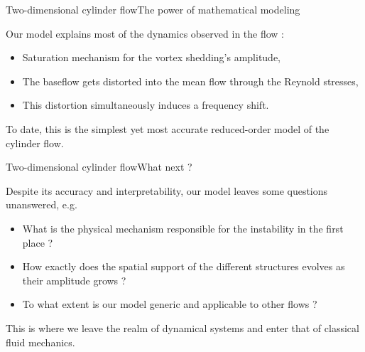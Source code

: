 \documentclass[usenames,dvipsnames,svgnames,10pt,aspectratio=169]{beamer}
\begin{document}
\begin{frame}[t, c]{Two-dimensional cylinder flow}{The power of mathematical modeling}
  \begin{minipage}{.68\textwidth}
    Our model explains most of the dynamics observed in the flow :

    \medskip

    \begin{itemize}
    \item Saturation mechanism for the vortex shedding's amplitude,
    \item The baseflow gets distorted into the mean flow through the Reynold stresses,
    \item This distortion simultaneously induces a frequency shift.
    \end{itemize}

    \medskip

    To date, this is the simplest yet most accurate reduced-order model of the cylinder flow.
  \end{minipage}%
  \hfill
  \begin{minipage}{.28\textwidth}
  \end{minipage}
\end{frame}




\begin{frame}[t, c]{Two-dimensional cylinder flow}{What next ?}
  \begin{minipage}{.68\textwidth}
    Despite its accuracy and interpretability, our model leaves some questions unanswered, e.g.

    \medskip

    \begin{itemize}
    \item What is the physical mechanism responsible for the instability in the first place ?
    \item How exactly does the spatial support of the different structures evolves as their amplitude grows ?
    \item To what extent is our model generic and applicable to other flows ?
    \end{itemize}

    \medskip

    This is where we leave the realm of dynamical systems and enter that of classical fluid mechanics.

  \end{minipage}%
  \hfill
  \begin{minipage}{.28\textwidth}
  \end{minipage}
\end{frame}
\end{document}
